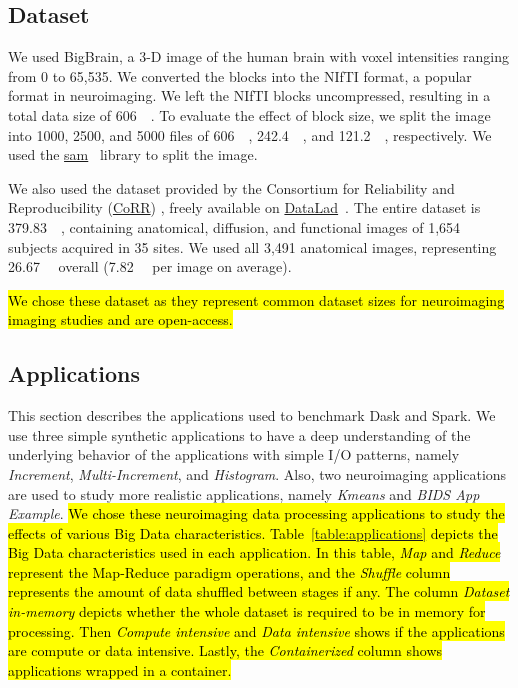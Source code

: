 \documentclass[AMA,STIX1COL]{WileyNJD-v2}
\newcommand{\HL}[1]{\hl{#1}}
\begin{document}
\subsection{Dataset}
We used BigBrain\cite{Amunts:13}, a 3-D image of the human brain with voxel
intensities ranging from 0 to 65,535. We converted the blocks into the
NIfTI format, a popular format in neuroimaging. We left the NIfTI blocks
uncompressed, resulting in a total data size of \SI{606}{\gibi\byte}. To
evaluate the effect of block size, we split the image into 1000, 2500,
and 5000 files of \SI{606}{\mebi\byte}, \SI{242.4}{\mebi\byte}, and
\SI{121.2}{\mebi\byte}, respectively.
We used the \href{https://github.com/big-data-lab-team/sam}{sam}~{\cite{sam}} library to split the image.
							
We also used the dataset provided by the Consortium for Reliability and
Reproducibility
(\href{http://fcon_1000.projects.nitrc.org/indi/CoRR/html/}{CoRR})
\cite{zuo2014open}, freely available on
\href{https://datasets.datalad.org/?dir=/corr/RawDataBIDS}{DataLad}~{\cite{DataladDataset}}.
The entire dataset is \SI{379.83}{\gibi\byte}, containing anatomical, diffusion,
and functional images of 1,654 subjects acquired in 35 sites.
We used all 3,491 anatomical images, representing \SI{26.67}{\gibi\byte} overall
(\SI{7.82}{\mebi\byte} per image on average).

\HL{
	We chose these dataset as they represent common dataset sizes for neuroimaging 
	imaging studies and are open-access.
}
							
\subsection{Applications}
This section describes the applications used to benchmark Dask and Spark.
We use three simple synthetic applications to have a deep understanding of the 
underlying behavior of the applications with simple I/O patterns, namely
\textit{Increment}, \textit{Multi-Increment}, and \textit{Histogram}.
Also, two neuroimaging applications are used to study more realistic 
applications, namely \textit{Kmeans} and \textit{BIDS App Example}{\cite{gorgolewski2017bids}}.
\HL{
	We chose these neuroimaging data processing applications to study the 
	effects of various Big Data characteristics.
	Table~{\ref{table:applications}} depicts the Big Data characteristics used in
	each application. 
	In this table, \textit{Map} and \textit{Reduce} represent the Map-Reduce paradigm operations,
	and the \textit{Shuffle} column represents the amount of data shuffled between stages if any.
	The column \textit{Dataset in-memory} depicts whether the whole dataset is required to 
	be in memory for processing.
	Then \textit{Compute intensive} and \textit{Data intensive} shows if the applications are
	compute or data intensive.
	Lastly, the \textit{Containerized} column shows applications wrapped in a container.
}
\end{document}
